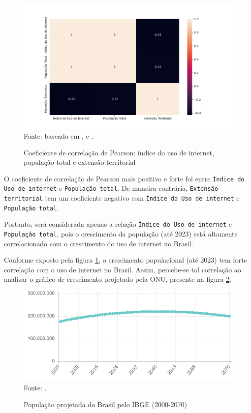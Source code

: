 \begin{figure}[H]
    \centering
    \caption{Coeficiente de correlação de Pearson: índice do uso de internet, população total e extensão territorial}
    \includegraphics[width=1\linewidth]{figuras/internet/correlacao.png}
    \label{fig:internet_correlacao}
    \footnotesize{Fonte: baseado em \cite{ONU_populacao_paises}, \cite{pnda_continua_anual_2016_2023} e \cite{ONU_tamanho_paises}.}
\end{figure}

O coeficiente de correlação de Pearson mais positivo e forte foi entre \texttt{Índice do Uso de internet} e \texttt{População total}. De maneira contrária, \texttt{Extensão territorial} tem um coeficiente negativo com \texttt{Índice do Uso de internet} e \texttt{População total}. 

Portanto, será considerada apenas a relação \texttt{Índice do Uso de internet} e \texttt{População total}, pois o crescimento da população (até 2023) está altamente correlacionado com o crescimento do uso de internet no Brasil.

Conforme exposto pela figura \ref{fig:internet_correlacao}, o crescimento populacional (até 2023) tem forte correlação com o uso de  internet no Brasil. Assim, percebe-se tal correlação ao analisar o gráfico de crescimento projetado pela ONU, presente na figura \ref{fig:populacao_brasil}.

\begin{figure}[H]
    \centering
    \caption{População projetada do Brasil pelo IBGE (2000-2070)}
    \includegraphics[width=1\linewidth]{figuras/populacao/populacao_brasil.png}
    \label{fig:populacao_brasil}
    \footnotesize{Fonte: \cite{IBGE_populacao_brasil}.}
\end{figure}

